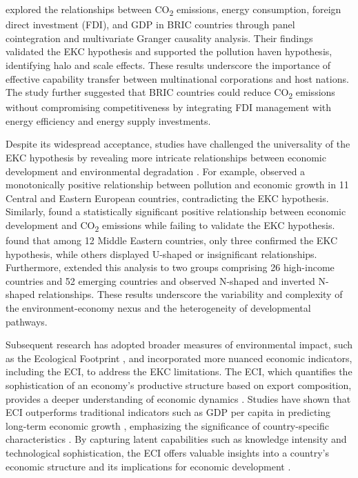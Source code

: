 \documentclass[10pt]{article}
\begin{document}
\cite{paoMultivariateGrangerCausality2011} explored the relationships between CO\textsubscript{2} emissions, energy consumption, foreign direct investment (FDI), and GDP in BRIC countries through panel cointegration and multivariate Granger causality analysis. Their findings validated the EKC hypothesis and supported the pollution haven hypothesis, identifying halo and scale effects. These results underscore the importance of effective capability transfer between multinational corporations and host nations. The study further suggested that BRIC countries could reduce CO\textsubscript{2} emissions without compromising competitiveness by integrating FDI management with energy efficiency and energy supply investments.

Despite its widespread acceptance, studies have challenged the universality of the EKC hypothesis by revealing more intricate relationships between economic development and environmental degradation \citep{purcelNewInsightsEnvironmental2020}. For example, \cite{lazarPollutionEconomicGrowth2019} observed a monotonically positive relationship between pollution and economic growth in 11 Central and Eastern European countries, contradicting the EKC hypothesis. Similarly, \cite{nasirRoleFinancialDevelopment2019} found a statistically significant positive relationship between economic development and CO\textsubscript{2} emissions while failing to validate the EKC hypothesis. \cite{ozcanNexusCarbonEmissions2013} found that among 12 Middle Eastern countries, only three confirmed the EKC hypothesis, while others displayed U-shaped or insignificant relationships. Furthermore, \cite{ozokcuEconomicGrowthEnergy2017} extended this analysis to two groups comprising 26 high-income countries and 52 emerging countries and observed N-shaped and inverted N-shaped relationships. These results underscore the variability and complexity of the environment-economy nexus and the heterogeneity of developmental pathways.

Subsequent research has adopted broader measures of environmental impact, such as the Ecological Footprint \citep{ecofootprint, destekInvestigationEnvironmentalKuznets2019}, and incorporated more nuanced economic indicators, including the ECI, to address the EKC limitations. The ECI, which quantifies the sophistication of an economy's productive structure based on export composition, provides a deeper understanding of economic dynamics \citep{hidalgoBuildingBlocksEconomic2009}. Studies have shown that ECI outperforms traditional indicators such as GDP per capita in predicting long-term economic growth \citep{hidalgoEconomicComplexityTheory2021}, emphasizing the significance of country-specific characteristics \citep{zhuEconomicComplexityHuman2017, guoTradeOpennessGlobalization2023}. By capturing latent capabilities such as knowledge intensity and technological sophistication, the ECI offers valuable insights into a country's economic structure and its implications for economic development \citep{hidalgoEconomicComplexityTheory2021}.
\end{document}
